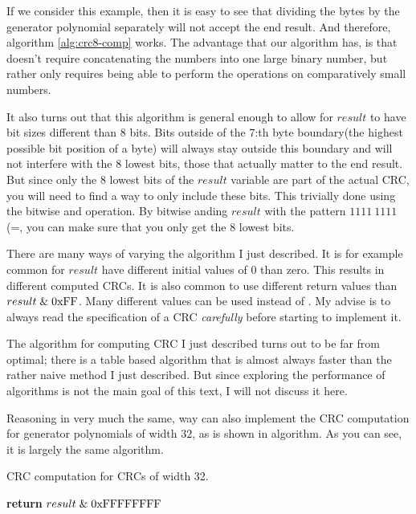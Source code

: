 If we consider this example, then it is easy to see that dividing the
bytes by the generator polynomial separately will not accept the end
result. And therefore, algorithm \ref{alg:crc8-comp} works. The
advantage that our algorithm has, is that doesn't require
concatenating the numbers into one large binary number, but rather
only requires being able to perform the operations on comparatively
small numbers.

It also turns out that this algorithm is general enough to allow for
$result$ to have bit sizes different than 8 bits. Bits outside of the
$7$:th byte boundary(the highest possible bit position of a byte) will
always stay outside this boundary and will not interfere with the 8
lowest bits, those that actually matter to the end result. But since
only the 8 lowest bits of the $result$ variable are part of the actual
CRC, you will need to find a way to only include these bits. This
trivially done using the bitwise and operation. By bitwise anding
$result$ with the pattern $1111\ 1111$(=, you can make sure
that you only get the 8 lowest bits.

There are many ways of varying the algorithm I just described. It is
for example common for $result$ have different initial values of $0$
than zero. This results in different computed CRCs. It is also common
to use different return values than $result \mathrel{\&} \mathrm{0xFF}$. Many
different values can be used instead of . My advise is to
always read the specification of a CRC \textit{carefully} before
starting to implement it.

The algorithm for computing CRC I just described turns out to be far
from optimal; there is a table based algorithm that is almost always
faster than the rather naive method I just described. But since
exploring the performance of algorithms is not the main goal of this
text, I will not discuss it here.

Reasoning in very much the same, way can also implement the CRC
computation for generator polynomials of width $32$, as is shown in
algorithm. As you can see, it is largely the same algorithm.

\begin{algorithm}[H]
  \caption{CRC computation for CRCs of width 32.}
  \label{alg:crc32-comp}
  \begin{algorithmic}[1]


    \Else
    \EndIf
    \EndRepeatn

    \EndForEach

    \State \textbf{return}  $result \mathrel{\&} \mathrm{0xFFFFFFFF}$
    \EndProcedure

  \end{algorithmic}
\end{algorithm}

